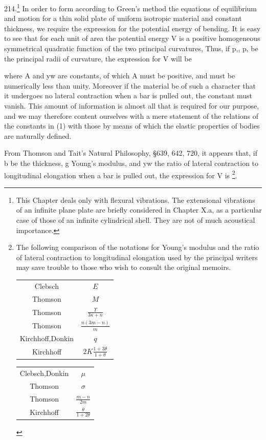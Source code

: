 
214.\footnote{This Chapter deals only with flexural vibrations. The
extensional vibrations of an infinite plane plate are briefly considered in
Chapter X.a, as a particular case of those of an infinite cylindrical shell.
They are not of much acoustical importance.}
In order to form according to Green's method the equations of
equilibrium and motion for a thin solid plate of uniform isotropic
material and constant thickness, we require the expression for the
potential energy of bending. It is easy to see that for each unit of
area the potential energy V is a positive homogeneous symmetrical
quadratic function of the two principal curvatures, Thus, if p,, p, be
the principal radii of curvature, the expression for V will be

where A and yw are constants, of which A must be positive, and must be
numerically less than unity. Moreover if the material be of such a
character that it undergoes no lateral contraction when a bar is pulled
out, the constant must vanish. This amount of information is almost all
that is required for our purpose, and we may therefore content ourselves
with a mere statement of the relations of the constants in (1) with
those by means of which the elastic properties of bodies are naturally
defined.


From Thomson and Tait's Natural Philosophy, \S 639, 642, 720, it
appears that, if b be the thickness, g Young's modulus, and yw the ratio
of lateral contraction to longitudinal elongation when a bar is pulled
out, the expression for V is
\footnote{The following comparison of the notations for Young's modulus and the ratio of lateral contraction to longitudinal elongation used by the principal writers may save trouble to those who wish to consult the original memoirs.
\begin{tabular}{cc}
Clebsch &\(E\) \\
Thomson &\(M\) \\
Thomson &\(\frac{\Upsilon }{3 \kappa +n }\) \\
Thomson &\(\frac{n(3m-n)}{m}\) \\
Kirchhoff,Donkin &\(q\) \\
Kirchhoff &\(2K \frac{1+3 \theta}{1+ \theta}\) \\
\end{tabular}
\begin{tabular}{cc}
Clebsch,Donkin &\(\mu\) \\
Thomson &\(\sigma\) \\
Thomson &\(\frac{m-n}{2m}\) \\
Kirchhoff &\(\frac{\theta}{1+2 \theta}\) \\
\end{tabular}
}.

